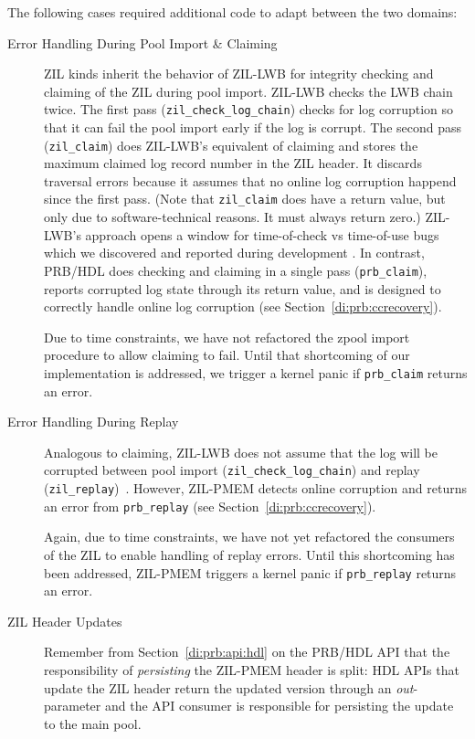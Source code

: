 \documentclass[12pt,a4paper,twoside]{book}
\begin{document}
The following cases required additional code to adapt between the two domains:
\begin{description}
    \item[Error Handling During Pool Import \& Claiming]
        ZIL kinds inherit the behavior of ZIL-LWB for integrity checking and claiming of the ZIL during pool import.
        ZIL-LWB checks the LWB chain twice.
        The first pass (\lstinline{zil_check_log_chain}) checks for log corruption so that it can fail the pool import early if the log is corrupt.
        The second pass (\lstinline{zil_claim}) does ZIL-LWB's equivalent of claiming and stores the maximum claimed log record number in the ZIL header.
        It discards traversal errors because it assumes that no online log corruption happend since the first pass.
        (Note that \lstinline{zil_claim} does have a return value, but only due to software-technical reasons. It must always return zero.)
        ZIL-LWB's approach opens a window for time-of-check vs time-of-use bugs which we discovered and reported during development \cite{OpenZFSGithubIssueHandlingOfLostClaimedNotReplayedLogRecords}.
        In contrast, PRB/HDL does checking and claiming in a single pass (\lstinline{prb_claim}), reports corrupted log state through its return value, and is designed to correctly handle online log corruption (see Section~\ref{di:prb:ccrecovery}).

        Due to time constraints, we have not refactored the zpool import procedure to allow claiming to fail.
        Until that shortcoming of our implementation is addressed, we trigger a kernel panic if \lstinline{prb_claim} returns an error.

    \item[Error Handling During Replay]
        Analogous to claiming, ZIL-LWB does not assume that the log will be corrupted between pool import (\lstinline{zil_check_log_chain}) and replay (\lstinline{zil_replay})~\cite{OpenZFSGithubIssueFailingDebugAssertionWhenLosingClaimedNotReplayedLWBs}.
        However, ZIL-PMEM detects online corruption and returns an error from \lstinline{prb_replay} (see Section~\ref{di:prb:ccrecovery}).

        Again, due to time constraints, we have not yet refactored the consumers of the ZIL to enable handling of replay errors.
        Until this shortcoming has been addressed, ZIL-PMEM triggers a kernel panic if \lstinline{prb_replay} returns an error.

    \item[ZIL Header Updates]
        Remember from Section~\ref{di:prb:api:hdl} on the PRB/HDL API that the responsibility of \textit{persisting} the ZIL-PMEM header is split:
        HDL APIs that update the ZIL header return the updated version through an \textit{out}-parameter and the API consumer is responsible for persisting the update to the main pool.


\end{description}
\end{document}
